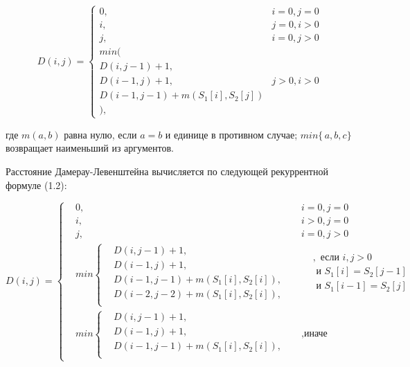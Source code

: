 \documentclass[12pt]{report}
\begin{document}
\begin{equation}
D(i,j) = \left\{ \begin{array}{ll}
 0, & \textrm{$i = 0, j = 0$}\\
 i, & \textrm{$j = 0, i > 0$}\\
 j, & \textrm{$i = 0, j > 0$}\\
min(\\
D(i,j-1)+1,\\
D(i-1, j) +1, &\textrm{$j>0, i>0$}\\
D(i-1, j-1) + m(S_{1}[i], S_{2}[j])\\
),
  \end{array} \right.
\end{equation}

где $m(a,b)$ равна нулю, если $a=b$ и единице в противном случае; $min\{\,a,b,c\}$ возвращает наименьший из аргументов.

Расстояние Дамерау-Левенштейна вычисляется по следующей рекуррентной формуле (1.2):

\begin{equation}	    
D(i, j) =  \left\{
	\begin{aligned}
		&0, && i = 0, j = 0\\
		    	&i, && i > 0, j = 0\\
		    	&j, && i = 0, j > 0\\		    	
		    	&min \left\{
				\begin{aligned}
					&D(i, j - 1) + 1,\\
		            &D(i - 1, j) + 1,\\
		            &D(i - 1, j - 1) + m(S_{1}[i], S_{2}[i]), \\
		            &D(i - 2, j - 2) + m(S_{1}[i], S_{2}[i]),\\
		        \end{aligned} \right.
		        && 
				\begin{aligned}
					&, \text{ если } i, j > 0 \\
		            & \text{ и } S_{1}[i] = S_{2}[j - 1] \\
		            & \text{ и } S_{1}[i - 1] =  S_{2}[j] \\
		        \end{aligned} \\ 
		        &min \left\{
		        \begin{aligned}
		            &D(i, j - 1) + 1,\\
		            &D(i - 1, j) + 1, \\
		            &D(i - 1, j - 1) + m(S_{1}[i], S_{2}[i]),\\
		        \end{aligned} \right.  &&, \text{иначе}
			\end{aligned} \right.
\end{equation}
\end{document}
